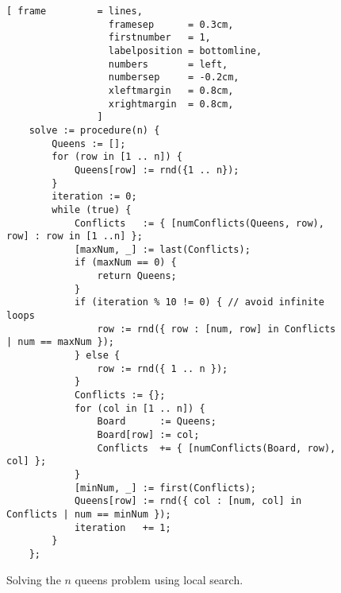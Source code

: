\begin{figure}[!ht]
\centering
\begin{Verbatim}[ frame         = lines, 
                  framesep      = 0.3cm, 
                  firstnumber   = 1,
                  labelposition = bottomline,
                  numbers       = left,
                  numbersep     = -0.2cm,
                  xleftmargin   = 0.8cm,
                  xrightmargin  = 0.8cm,
                ]
    solve := procedure(n) {
        Queens := [];
        for (row in [1 .. n]) {
            Queens[row] := rnd({1 .. n});
        }
        iteration := 0;
        while (true) {
            Conflicts   := { [numConflicts(Queens, row), row] : row in [1 ..n] };
            [maxNum, _] := last(Conflicts);
            if (maxNum == 0) {
                return Queens;
            }
            if (iteration % 10 != 0) { // avoid infinite loops
                row := rnd({ row : [num, row] in Conflicts | num == maxNum });
            } else {
                row := rnd({ 1 .. n });
            }
            Conflicts := {};
            for (col in [1 .. n]) {
                Board      := Queens;
                Board[row] := col;
                Conflicts  += { [numConflicts(Board, row), col] };
            }
            [minNum, _] := first(Conflicts);
            Queens[row] := rnd({ col : [num, col] in Conflicts | num == minNum });
            iteration   += 1;
        }
    };
\end{Verbatim}
\vspace*{-0.3cm}
\caption{Solving the $n$ queens problem using local search.}
\label{fig:constraints.stlx}
\end{figure}

